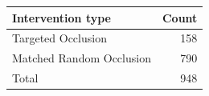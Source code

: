 \begin{tabular}{lr}
\toprule
Intervention type & Count \\
\midrule
Targeted Occlusion & 158 \\
Matched Random Occlusion & 790 \\
\midrule
Total & 948 \\
\bottomrule
\end{tabular}
